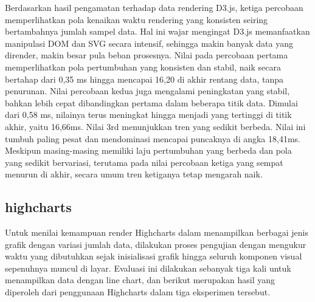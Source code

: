 Berdasarkan hasil pengamatan terhadap data rendering D3.js, ketiga percobaan memperlihatkan pola kenaikan waktu rendering yang konsisten seiring bertambahnya jumlah sampel data. Hal ini wajar mengingat D3.js memanfaatkan manipulasi DOM dan SVG secara intensif, sehingga makin banyak data yang dirender, makin besar pula beban prosesnya. 
Nilai pada percobaan pertama memperlihatkan pola pertumbuhan yang konsisten dan stabil, naik secara bertahap dari 0,35 ms hingga mencapai 16,20 di akhir rentang data, tanpa penurunan. Nilai percobaan kedua juga mengalami peningkatan yang stabil, bahkan lebih cepat dibandingkan pertama dalam beberapa titik data. Dimulai dari 0,58 ms, nilainya terus meningkat hingga menjadi yang tertinggi di titik akhir, yaitu 16,66ms. 
Nilai 3rd menunjukkan tren yang sedikit berbeda. Nilai ini tumbuh paling pesat dan mendominasi mencapai puncaknya di angka 18,41ms.
Meskipun masing-masing memiliki laju pertumbuhan yang berbeda dan pola yang sedikit bervariasi, terutama pada nilai percobaan ketiga yang sempat menurun di akhir, secara umum tren ketiganya tetap mengarah naik.


\subsection{highcharts}
Untuk menilai kemampuan render Highcharts dalam menampilkan berbagai jenis grafik dengan variasi jumlah data, dilakukan proses pengujian dengan mengukur waktu yang dibutuhkan sejak inisialisasi grafik hingga seluruh komponen visual sepenuhnya muncul di layar. Evaluasi ini dilakukan sebanyak tiga kali untuk menampilkan data dengan line chart, dan berikut merupakan hasil yang diperoleh dari penggunaan Highcharts dalam tiga eksperimen tersebut.

